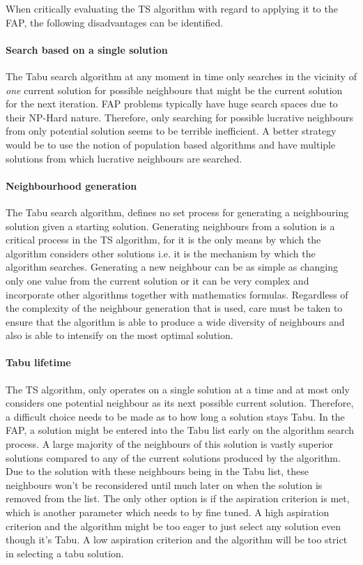 When critically evaluating the TS algorithm with regard to applying it to the FAP, the following disadvantages can be identified.
\paragraph{Search based on a single solution}
The Tabu search algorithm at any moment in time only searches in the vicinity of \emph{one} current solution for possible neighbours that might be the current solution for the next iteration. FAP problems typically have huge search spaces due to their NP-Hard nature. Therefore, only searching for possible lucrative neighbours from only potential solution seems to be terrible inefficient. A better strategy would be to use the notion of population based algorithms and have multiple solutions from which lucrative neighbours are searched.
\paragraph{Neighbourhood generation}
The Tabu search algorithm, defines no set process for generating a neighbouring solution given a starting solution. Generating neighbours from a solution is a critical process in the TS algorithm, for it is the only means by which the algorithm considers other solutions i.e. it is the mechanism by which the algorithm searches. Generating a new neighbour can be as simple as changing only one value from the current solution or it can be very complex and incorporate other algorithms together with mathematics formulas. Regardless of the complexity of the neighbour generation that is used, care must be taken to ensure that the algorithm is able to produce a wide diversity of neighbours and also is able to intensify on the most optimal solution.
\paragraph{Tabu lifetime}
The TS algorithm, only operates on a single solution at a time and at most only considers one potential neighbour as its next possible current solution. Therefore, a difficult choice needs to be made as to how long a solution stays Tabu. In the FAP, a solution might be entered into the Tabu list early on the algorithm search process. A large majority of the neighbours of this solution is vastly superior solutions compared to any of the current solutions produced by the algorithm. Due to the solution with these neighbours being in the Tabu list, these neighbours won't be reconsidered until much later on when the solution is removed from the list. The only other option is if the aspiration criterion is met, which is another parameter which needs to by fine tuned. A high aspiration criterion and the algorithm might be too eager to just select any solution even though it's Tabu. A low aspiration criterion and the algorithm will be too strict in selecting a tabu solution.

